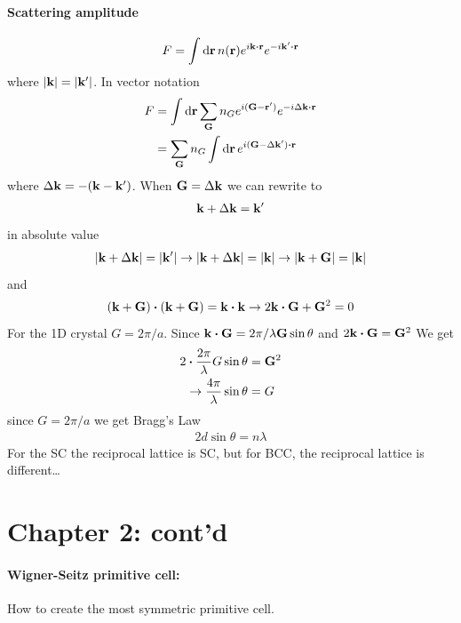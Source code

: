 \documentclass[../main.tex]{subfiles}
\begin{document}
\paragraph{Scattering amplitude}
\begin{align*}
    F = \int \dd{\vb{r}} n(\vb{r}) e^{i\vb{k} \vdot \vb{r}} e^{-i\vb{k}' \vdot \vb{r}}
\end{align*}
where $\abs{\vb{k}} = \abs{\vb{k}'}$. In vector notation
\begin{align*}
    F &= \int \dd{\vb{r}} \sum_{\vb{G}} n_G e^{i(\vb{G} - \vb{r}')} e^{-i\Delta\vb{k} \vdot \vb{r}} \\
    &= \sum_{\vb{G}} n_G \int \dd{\vb{r}} e^{i(\vb{G} - \Delta\vb{k}') \vdot \vb{r}} \\
\end{align*}
where $\Delta\vb{k} = -(\vb{k} - \vb{k}')$. When $\vb{G} = \Delta\vb{k}$ we can rewrite to
\begin{align*}
    \vb{k} + \Delta\vb{k} = \vb{k}'
\end{align*}
in absolute value
\begin{align*}
    \abs{\vb{k} + \Delta\vb{k}} = \abs{\vb{k}'} \rightarrow
    \abs{\vb{k} + \Delta\vb{k}} = \abs{\vb{k}} \rightarrow
    \abs{\vb{k} + \vb{G}} = \abs{\vb{k}}
\end{align*}
and
\begin{align*}
    (\vb{k} + \vb{G}) \vdot (\vb{k} + \vb{G}) = \vb{k} \vdot \vb{k} \rightarrow
    2\vb{k} \vdot \vb{G} + \vb{G}^2 = 0
\end{align*}
For the 1D crystal $G = 2\pi / a$. Since $\vb{k} \vdot \vb{G} = 2\pi/\lambda \vb{G} \sin\theta$
and $2\vb{k} \vdot \vb{G} = \vb{G}^2$
We get
\begin{align*}
    2 \vdot \frac{2\pi}{\lambda} G \sin\theta &= \vb{G}^2 \\
    \rightarrow \frac{4\pi}{\lambda} \sin\theta &= G 
\end{align*}
since $G = 2\pi / a$ we get Bragg's Law
\begin{align*}
    2d \sin\theta = n\lambda
\end{align*}
For the SC the reciprocal lattice is SC, but for BCC, the reciprocal lattice is different\dots

\newpage
{}

\section*{Chapter 2: cont'd}

\paragraph{Wigner-Seitz primitive cell:} How to create the most symmetric primitive cell.
\end{document}
